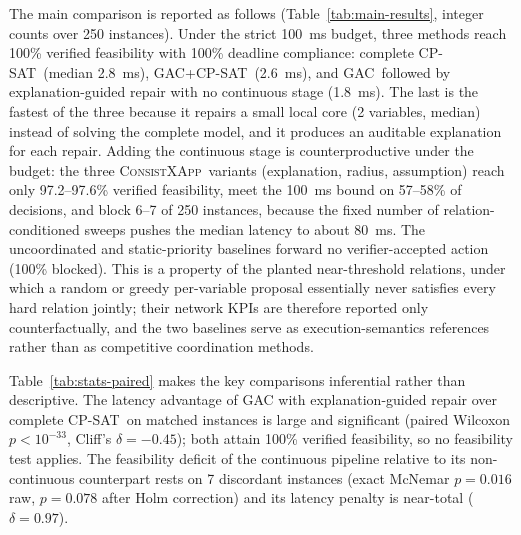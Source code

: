 \documentclass[pdflatex,sn-mathphys-num,iicol,oneside]{sn-jnl}
\newcommand{\method}{\textsc{ConsistXApp}}
\newcommand{\gac}{\textsc{GAC}}
\newcommand{\cpsat}{\textsc{CP-SAT}}
\begin{document}
The main comparison is reported as follows (Table~\ref{tab:main-results},
integer counts over 250 instances). Under the strict 100~ms budget,
three methods reach 100\% verified feasibility with 100\% deadline
compliance: complete \cpsat\ (median 2.8~ms), \gac+\cpsat\ (2.6~ms), and
\gac\ followed by explanation-guided repair with no continuous stage
(1.8~ms). The last is the fastest of the three because it repairs a
small local core (2 variables, median) instead of solving the complete
model, and it produces an auditable explanation for each repair. Adding
the continuous stage is counterproductive under the budget: the three
\method\ variants (explanation, radius, assumption) reach only
97.2--97.6\% verified feasibility, meet the 100~ms bound on 57--58\% of
decisions, and block 6--7 of 250 instances, because the fixed number of
relation-conditioned sweeps pushes the median latency to about 80~ms.
The uncoordinated and static-priority baselines forward no
verifier-accepted action (100\% blocked). This is a property of the
planted near-threshold relations, under which a random or greedy
per-variable proposal essentially never satisfies every hard relation
jointly; their network KPIs are therefore reported only
counterfactually, and the two baselines serve as execution-semantics
references rather than as competitive coordination methods.

Table~\ref{tab:stats-paired} makes the key comparisons inferential
rather than descriptive. The latency advantage of GAC with
explanation-guided repair over complete \cpsat\ on matched instances is
large and significant (paired Wilcoxon $p<10^{-33}$, Cliff's
$\delta=-0.45$); both attain 100\% verified feasibility, so no
feasibility test applies. The feasibility deficit of the continuous
pipeline relative to its non-continuous counterpart rests on 7
discordant instances (exact McNemar $p=0.016$ raw, $p=0.078$ after Holm
correction) and its latency penalty is near-total
($\delta=0.97$).
\end{document}
